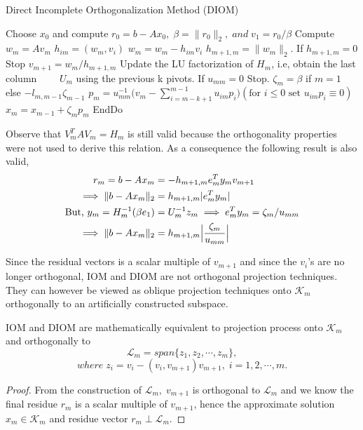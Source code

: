 \documentclass[10pt,a4paper]{article}
\begin{document}
\begin{algorithm}
\caption{Direct Incomplete Orthogonalization Method (DIOM)}
\begin{algorithmic}[1]
\State Choose $x_0$ and compute $r_0=b-Ax_0,\;\beta=\|r_0\|_2,\;and\;v_1=r_0/\beta$
	\State Compute $w_m = Av_m$
		\State $h_{im} = (w_m,v_i)$
		\State $w_m = w_m - h_{im}v_i$
	\EndFor
	\State $h_{m+1,m} = \|w_m\|_2$. If $h_{m+1,m}=0$ Stop
	\State $v_{m+1}=w_m/h_{m+1,m}$
	\State Update the LU factorization of $H_m$, i.e, obtain the last column 	
	\State $\qquad U_m$ using the previous k pivots. If $u_{mm}=0$ Stop.
	\State $\zeta_m = \beta$ if $m=1$ else $-l_{m,m-1}\zeta_{m-1}$
	\State $p_m = u^{-1}_{mm}\Big( v_m-\sum^{m-1}_{i=m-k+1}u_{im}p_i \Big)(\text{for }i\le0\text{ set }u_{im}p_i\equiv0)$
	\State $x_m=x_{m-1}+\zeta_mp_m$
\EndFor
\State EndDo
\end{algorithmic}
\end{algorithm}

\begin{remark}
Observe that $V^T_mAV_m=H_m$ is still valid because the orthogonality properties were not used to derive this relation. As a consequence the following result  is also valid,
\begin{align*}
r_m = b-Ax_m &= -h_{m+1,m}e^T_my_mv_{m+1} \\
\implies \|b-Ax_m\|_2 &= h_{m+1,m}|e^T_my_m| \\
\text{But, }y_m = H^{-1}_m(\beta	e_1) &= U^{-1}_mz_m \implies e^T_my_m = \zeta_m/u_{mm} \\
\implies \|b-Ax_m\|_2 &= h_{m+1,m}\Bigl|\frac{\zeta_m}{u_{mm}}\Bigr|
\end{align*}
\end{remark}

Since the residual vectors is a scalar multiple of $v_{m+1}$ and since the $v_i$'s are no longer orthogonal, IOM and DIOM are not orthogonal projection techniques. They can however be viewed as oblique projection techniques onto $\mathcal{K}_m$ orthogonally to an artificially constructed subspace.

\begin{proposition}
IOM and DIOM are mathematically equivalent to projection process onto $\mathcal{K}_m$ and orthogonally to
$$\mathcal{L}_m=span\{z_1,z_2,\cdots,z_m\},$$
$$where\;z_i=v_i-(v_i,v_{m+1})v_{m+1},\;i=1,2,\cdots,m.$$
\end{proposition}

\begin{proof}
From the construction of $\mathcal{L}_m,\;v_{m+1}$ is orthogonal to $\mathcal{L}_m$ and we know the final residue $r_m$ is a scalar multiple of $v_{m+1}$, hence the approximate solution $x_m\in\mathcal{K}_m$ and residue vector $r_m\perp\mathcal{L}_m$.  
\end{proof}
\end{document}
